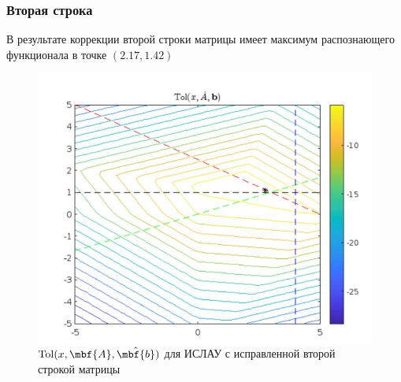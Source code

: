 \documentclass[12pt,a4paper]{article}
\begin{document}
        \subsubsection{Вторая строка}
            В результате коррекции второй строки матрицы имеет максимум распознающего функционала в точке $(2.17,1.42)$
            \begin{figure}[H]
                \centering
                \includegraphics[width=16cm]{tol_second.png}
                \caption{$\mathrm{Tol}(x,\mbf{A}, \hat{\mbf{b}})$ для ИСЛАУ с исправленной второй строкой матрицы}
                \label{fig:aiverve}
            \end{figure}
            
\end{document}
